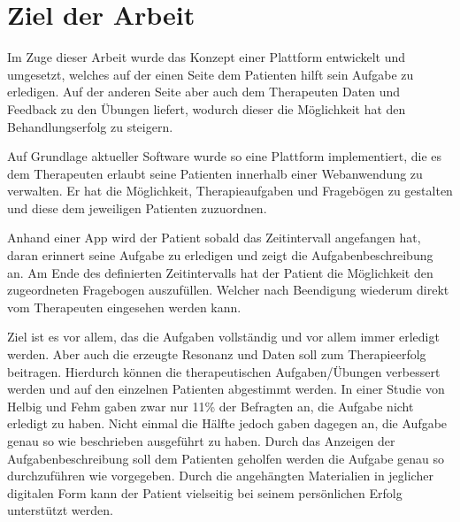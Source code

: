 \section{Ziel der Arbeit}

Im Zuge dieser Arbeit wurde das Konzept einer Plattform entwickelt und umgesetzt, welches auf der einen Seite dem Patienten hilft sein Aufgabe zu erledigen. Auf der anderen Seite aber auch dem Therapeuten Daten und Feedback zu den Übungen liefert, wodurch dieser die Möglichkeit hat den Behandlungserfolg zu steigern.

Auf Grundlage aktueller Software wurde so eine Plattform implementiert, die es dem Therapeuten erlaubt seine Patienten innerhalb einer Webanwendung zu verwalten. Er hat die Möglichkeit, Therapieaufgaben und Fragebögen zu gestalten und diese dem jeweiligen Patienten zuzuordnen.

Anhand einer App wird der Patient sobald das Zeitintervall angefangen hat, daran erinnert seine Aufgabe zu erledigen und zeigt die Aufgabenbeschreibung an. Am Ende des definierten Zeitintervalls hat der Patient die Möglichkeit den zugeordneten Fragebogen auszufüllen. Welcher nach Beendigung wiederum direkt vom Therapeuten eingesehen werden kann.

Ziel ist es vor allem, das die Aufgaben vollständig und vor allem immer erledigt werden. Aber auch die erzeugte Resonanz und Daten soll zum Therapieerfolg beitragen. Hierdurch können die therapeutischen Aufgaben/Übungen verbessert werden und auf den einzelnen Patienten abgestimmt werden.
In einer Studie von Helbig und Fehm \cite{bibid} gaben zwar nur 11\% der Befragten an, die Aufgabe nicht erledigt zu haben. Nicht einmal die Hälfte jedoch gaben dagegen an, die Aufgabe genau so wie beschrieben ausgeführt zu haben. Durch das Anzeigen der Aufgabenbeschreibung soll dem Patienten geholfen werden die Aufgabe genau so durchzuführen wie vorgegeben. Durch die angehängten Materialien in jeglicher digitalen Form kann der Patient vielseitig bei seinem persönlichen Erfolg unterstützt werden.

